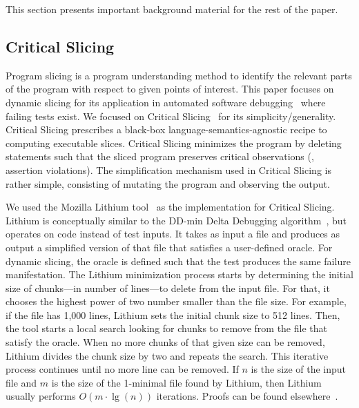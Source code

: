 \documentclass[sigplan,10pt,review,anonymous]{acmart}\settopmatter{printfolios=true,printccs=false,printacmref=false}
\begin{document}
This section presents important background material for the rest of the paper.

\subsection{Critical Slicing}
\label{sec:slicing}


Program slicing is a program understanding method to identify the
relevant parts of the program with respect to given points of
interest.  This paper focuses on dynamic slicing
for its application in automated software
debugging~\cite{Binkley:2014:OLP:2635868.2635893} where failing tests
exist. We focused on Critical
Slicing~\cite{DeMillo:1996:CSS:229000.226310} for its
simplicity/generality. Critical Slicing
prescribes a black-box language-semantics-agnostic recipe to computing
executable slices.  Critical Slicing minimizes the program by deleting
statements such that the sliced program preserves critical
observations (\eg{}, assertion violations). The simplification
mechanism used in Critical Slicing is rather simple, consisting of
mutating the program and observing the output.

We used the Mozilla Lithium tool~\cite{lithium} as the implementation
for Critical Slicing. Lithium is conceptually similar to the DD-min
Delta Debugging algorithm~\cite{zeller-hildebrandt-tse2002}, but
operates on code instead of test inputs. It takes as input a file and
produces as output a simplified version of that file that satisfies a
user-defined oracle. For dynamic slicing, the oracle is defined such
that the test produces the same failure manifestation. The Lithium
minimization process starts by determining the initial size of
chunks---in number of lines---to delete from the input file. For that,
it chooses the highest power of two number smaller than the file
size. For example, if the file has 1,000 lines, Lithium sets the
initial chunk size to 512 lines. Then, the tool starts a local search
looking for chunks to remove from the file that satisfy the
oracle. When no more chunks of that given size can be removed, Lithium
divides the chunk size by two and repeats the search. This iterative
process continues until no more line can be removed.  If $n$ is the
size of the input file and $m$ is the size of the 1-minimal file found
by Lithium, then Lithium usually performs $O(m\cdot\lg(n))$
iterations. Proofs can be found elsewhere~\cite{lithium-complexity}.
\end{document}
